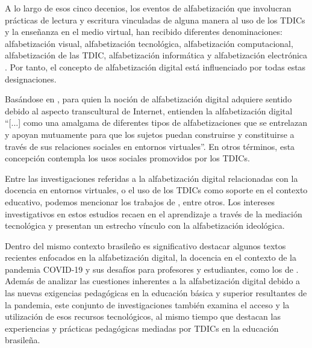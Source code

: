 \documentclass[spanish]{textolivre}
\begin{document}
A lo largo de esos cinco decenios, los eventos de alfabetización que involucran prácticas de lectura y escritura vinculadas de alguna manera al uso de los TDICs y la enseñanza en el medio virtual, han recibido diferentes denominaciones: alfabetización visual, alfabetización tecnológica, alfabetización computacional, alfabetización de las TDIC, alfabetización informática y alfabetización electrónica \cite{araujo_letramento_2014}. Por tanto, el concepto de alfabetización digital está influenciado por todas estas designaciones. 

Basándose en \textcite{buzato_desafios_2007}, para quien la noción de alfabetización digital adquiere sentido debido al aspecto transcultural de Internet, \textcite[p. 301]{araujo_letramento_2014} entienden la alfabetización digital “[...] como una amalgama de diferentes tipos de alfabetizaciones que se entrelazan y apoyan mutuamente para que los sujetos puedan construirse y constituirse a través de sus relaciones sociales en entornos virtuales”. En otros términos, esta concepción contempla los usos sociales promovidos por los TDICs.

Entre las investigaciones referidas a la alfabetización digital relacionadas con la docencia en entornos virtuales, o el uso de los TDICs como soporte en el contexto educativo, podemos mencionar los trabajos de \textcite{coscarelli__letramento_2011, signorini_letramentos_2012, komesu_letramentos_2013, araujo_letramento_2014, vidotti_de_rezende_o_2016, ribeiro_tecnologia_2016}, entre otros. Los intereses investigativos en estos estudios recaen en el aprendizaje a través de la mediación tecnológica y presentan un estrecho vínculo con la alfabetización ideológica.

Dentro del mismo contexto brasileño es significativo destacar algunos textos recientes enfocados en la alfabetización digital, la docencia en el contexto de la pandemia COVID-19 y sus desafíos para profesores y estudiantes, como los de \textcite{almeida_letramento_2020, arruda__educacao_2020, carneiro_uso_2020, silva_letramento_2020}. Además de analizar las cuestiones inherentes a la alfabetización digital debido a las nuevas exigencias pedagógicas en la educación básica y superior resultantes de la pandemia, este conjunto de investigaciones también examina el acceso y la utilización de esos recursos tecnológicos, al mismo tiempo que destacan las experiencias y prácticas pedagógicas mediadas por TDICs en la educación brasileña.
\end{document}
